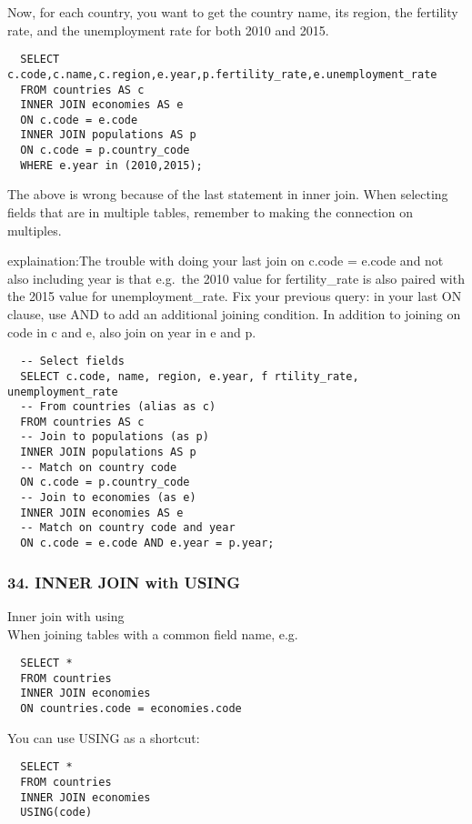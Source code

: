 \documentclass[
]{article}
\begin{document}
Now, for each country, you want to get the country name, its region, the
fertility rate, and the unemployment rate for both 2010 and 2015.

\begin{verbatim}
  SELECT c.code,c.name,c.region,e.year,p.fertility_rate,e.unemployment_rate
  FROM countries AS c
  INNER JOIN economies AS e
  ON c.code = e.code
  INNER JOIN populations AS p
  ON c.code = p.country_code
  WHERE e.year in (2010,2015);
\end{verbatim}

The above is wrong because of the last statement in inner join. When
selecting fields that are in multiple tables, remember to making the
connection on multiples.

explaination:The trouble with doing your last join on c.code = e.code
and not also including year is that e.g.~the 2010 value for
fertility\_rate is also paired with the 2015 value for
unemployment\_rate. Fix your previous query: in your last ON clause, use
AND to add an additional joining condition. In addition to joining on
code in c and e, also join on year in e and p.

\begin{verbatim}
  -- Select fields
  SELECT c.code, name, region, e.year, f rtility_rate, unemployment_rate
  -- From countries (alias as c)
  FROM countries AS c
  -- Join to populations (as p)
  INNER JOIN populations AS p
  -- Match on country code
  ON c.code = p.country_code
  -- Join to economies (as e)
  INNER JOIN economies AS e
  -- Match on country code and year
  ON c.code = e.code AND e.year = p.year;
\end{verbatim}

\hypertarget{inner-join-with-using}{%
\subsubsection{34. INNER JOIN with USING}\label{inner-join-with-using}}

Inner join with using\\
When joining tables with a common field name, e.g.~

\begin{verbatim}
  SELECT *
  FROM countries
  INNER JOIN economies
  ON countries.code = economies.code
\end{verbatim}

You can use USING as a shortcut:

\begin{verbatim}
  SELECT *
  FROM countries
  INNER JOIN economies
  USING(code)
\end{verbatim}
\end{document}
